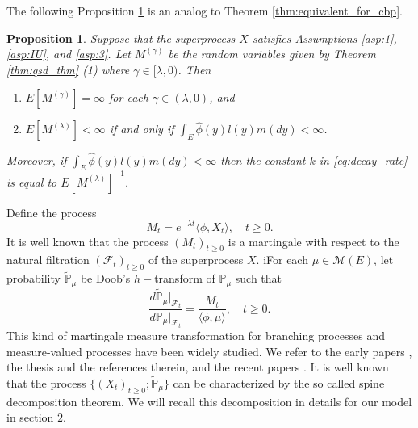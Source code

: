 \documentclass[12pt,a4paper]{amsart}
\numberwithin{equation}{section}
\theoremstyle{plain}
\newtheorem{prop}[thm]{Proposition}
\theoremstyle{definition}
\begin{document}
The following Proposition \ref{eq:exp_prop} is an analog to Theorem \ref{thm:equivalent_for_cbp}. 
\begin{prop}\label{eq:exp_prop}
	Suppose that the superprocess $X$ satisfies Assumptions \ref{asp:1},
  \ref{asp:IU}, and \ref{asp:3}.
	Let $M^{(\gamma)}$ be the random variables given by Theorem \ref{thm:qsd_thm} (1) where $\gamma \in [\lambda, 0)$.
  Then
  \begin{enumerate}
  \item
    $E[M^{(\gamma)}] = \infty$ for each $\gamma \in (\lambda, 0)$, and
  \item
    $E[M^{(\lambda)}] < \infty$ if and only if $\int_E \widehat\phi(y)l(y)m(dy)<\infty$.
  \end{enumerate}
  Moreover, if $\int_E \widehat\phi(y)l(y)m(dy)<\infty$ then the constant $k$ in \eqref{eq:decay_rate} is equal to $E[M^{(\lambda)}]^{-1}$.
\end{prop}
\begin{comment}
Recall the LlogL criteria of Theorem \ref{thm:equivalent_for_cbp}, we can say the above equivalency in proposition \ref{eq:exp_prop} is the same to that between items $(i)$ and $(iii)$ there.
\end{comment}
\par
Define the process
\[
	M_t=e^{-\lambda t}  \langle \phi, X_t\rangle, \quad t\geq 0.
\]
It is well known that the process  $(M_t)_{t\geq 0}$ is a martingale with respect to the natural filtration $(\mathscr F_t)_{t\geq 0}$ of the superprocess $X$.
iFor each $\mu \in \mathcal M(E)$, let probability $\widetilde{\mathbb P}_\mu$ be Doob's $h-$transform of $\mathbb P_\mu$ such that
\begin{equation} \label{eq:martingale_transformation}
	\frac{d\widetilde{\mathbb P}_\mu|_{\mathscr F_t}}{d\mathbb P_\mu|_{\mathscr F_t}}
	=\frac{M_t}{\langle\phi,\mu\rangle },
	\quad t\geq 0.
\end{equation}
This kind of martingale measure transformation for branching processes and measure-valued processes have been widely studied.
We refer to the early papers \cite{EnglanderKyprianou2004Local,Evans1993Two,RoellyRouault1989Processus}, the thesis \cite{Penisson2010Conditional} and the references therein, and the recent papers \cite{ChampagnatRoelly2008Limit,RenSongSun2019Spine,RenSongZhang2018Williams}.
It is well known that the process $\{(X_t)_{t\geq 0}; \widetilde{\mathbb P}_{\mu}\}$ can be characterized by the so called spine decomposition theorem.
We will recall this decomposition in details for our model in section $2$.
\end{document}
